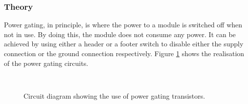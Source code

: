 \subsubsection{Theory}

Power gating, in principle, is where the power to a module is switched off when not in use. 
By doing this, the module does not consume any power. 
It can be achieved by using either a header or a footer switch to disable either the supply connection or the ground connection respectively. 
Figure \ref{fig:powerswitches} shows the realisation of the power gating circuits.

\begin{figure}[h]
\centering
~
\caption{Circuit diagram showing the use of power gating transistors.}%
\label{fig:powerswitches}
\end{figure}



